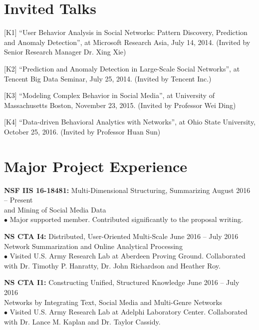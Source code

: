 \documentclass[margin, 10pt]{res}
\begin{document}
\begin{resume}

\section{Invited Talks}

[K1] ``User Behavior Analysis in Social Networks: Pattern Discovery, Prediction and Anomaly Detection'', at Microsoft Research Asia, July 14, 2014. (Invited by Senior Research Manager Dr. Xing Xie)

[K2] ``Prediction and Anomaly Detection in Large-Scale Social Networks'', at Tencent Big Data Seminar, July 25, 2014. (Invited by Tencent Inc.)

[K3] ``Modeling Complex Behavior in Social Media'', at University of Massachusetts Boston, November 23, 2015. (Invited by Professor Wei Ding)

[K4] ``Data-driven Behavioral Analytics with Networks'', at Ohio State University, October 25, 2016. (Invited by Professor Huan Sun)


\section{Major Project Experience}

{\textbf{NSF IIS 16-18481:} Multi-Dimensional Structuring, Summarizing} \hfill{August 2016 -- Present} \\
{and Mining of Social Media Data} \\
$\bullet$ Major supported member. Contributed significantly to the proposal writing.

{\textbf{NS CTA I4:} Distributed, User-Oriented Multi-Scale} \hfill{June 2016 -- July 2016} \\
{Network Summarization and Online Analytical Processing} \\
$\bullet$ Visited U.S. Army Research Lab at Aberdeen Proving Ground.
Collaborated with Dr. Timothy P. Hanratty, Dr. John Richardson and Heather Roy.

{\textbf{NS CTA I1:} Constructing Unified, Structured Knowledge} \hfill{June 2016 -- July 2016} \\
{Networks by Integrating Text, Social Media and Multi-Genre Networks} \hfill{} \\
$\bullet$ Visited U.S. Army Research Lab at Adelphi Laboratory Center. Collaborated with Dr. Lance M. Kaplan and Dr. Taylor Cassidy.


\end{resume}
\end{document}
